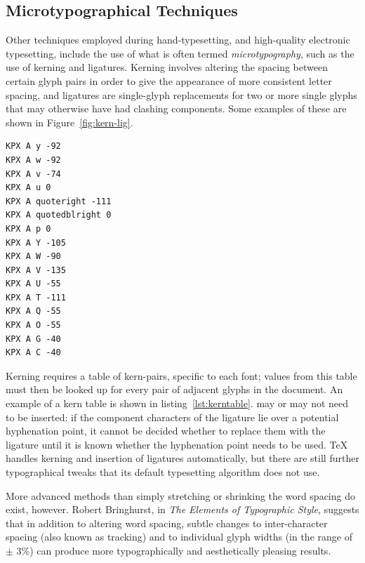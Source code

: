 \subsection{Microtypographical Techniques}
\label{sec:microtypography}
Other techniques employed during hand-type\-set\-t\-ing, and high-qua\-l\-ity electronic typesetting, include the use of what is often termed \emph{micro\-typo\-graphy},\cite{Hurst2009} such as the use of kerning and ligatures. Kerning involves altering the spacing between certain glyph pairs in order to give the appearance of more consistent letter spacing, and ligatures are sin\-gle-glyph replacements for two or more single glyphs that may otherwise have had clashing components. Some examples of these are shown in Figure~\ref{fig:kern-lig}.

\begin{lstlisting}[label=lst:kerntable,captionpos=b,float,basicstyle=\ttfamily\footnotesize,caption={[Excerpt from a kern table]An excerpt from a kern table for Times Roman, showing kern pairs beginning with \texttt{A} only. This is taken from an AFM (Adobe Font Metrics) file, where the units are (according to the specification\cite{FILLMEIN}) \emph{equal to 1/1000 of the scale factor (point size) of the font being used}.}]
KPX A y -92
KPX A w -92
KPX A v -74
KPX A u 0
KPX A quoteright -111
KPX A quotedblright 0
KPX A p 0
KPX A Y -105
KPX A W -90
KPX A V -135
KPX A U -55
KPX A T -111
KPX A Q -55
KPX A O -55
KPX A G -40
KPX A C -40
\end{lstlisting}


Kerning requires a table of kern-pairs, specific to each font; values from this table must then be looked up for every pair of adjacent glyphs in the document. An example of a kern table is shown in listing~\ref{lst:kerntable}. may or may not need to be inserted: if the component characters of the ligature lie over a potential hyphenation point, it cannot be decided whether to replace them with the ligature until it is known whether the hyphenation point needs to be used. \TeX{} handles kerning and insertion of ligatures automatically, but there are still further typographical tweaks that its default typesetting algorithm does not use.

More advanced methods than simply stretching or shrinking the word spacing do exist, however. Robert Bringhurst, in \emph{The Elements of Typographic Style},\cite{Bringhurst2008} suggests that in addition to altering word spacing, subtle changes to inter-character spacing (also known as \gls{tracking}) and to individual glyph widths (in the range of $\pm$ 3\%) can produce more typographically and aesthetically pleasing results.





